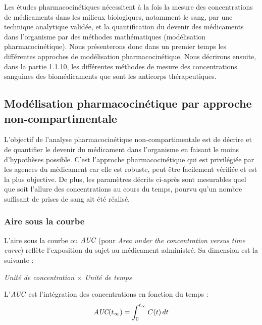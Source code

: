 Les études pharmacocinétiques nécessitent à la fois la mesure des concentrations de médicaments dans les milieux biologiques, notamment le sang, par une technique analytique validée, et la quantification du devenir des médicaments dans l'organisme par des méthodes mathématiques (modélisation pharmacocinétique). Nous présenterons donc dans un premier temps les différentes approches de modélisation pharmacocinétique. Nous décrirons ensuite, dans la partie 1.1.10, les différentes méthodes de mesure des concentrations sanguines des biomédicaments que sont les anticorps thérapeutiques.

\subsection{Modélisation pharmacocinétique par approche non-compartimentale}
L'objectif de l'analyse pharmacocinétique non-compartimentale est de décrire et de quantifier le devenir du médicament dans l'organisme en faisant le moins d'hypothèses possible. C'est l'approche pharmacocinétique qui est privilégiée par les agences du médicament car elle est robuste, peut être facilement vérifiée et est la plus objective. De plus, les paramètres décrits ci-après sont mesurables quel que soit l'allure des concentrations au cours du temps, pourvu qu'un nombre suffisant de prises de sang ait été réalisé.

\subsubsection{Aire sous la courbe}
L'aire sous la courbe ou $\operatorname{\textit{AUC}}$ (pour \textit{Area under the concentration versus time curve}) reflète l'exposition du sujet au médicament administré. Sa dimension est la suivante :

\begin{center}
\textit{Unité de concentration $\times$ Unité de temps}
\end{center}

L'$\operatorname{\textit{AUC}}$ est l'intégration des concentrations en fonction du temps :
\begin{equation}
\operatorname{\textit{AUC}}(t_\infty)=\int_{0}^{t_\infty}C(t) \, dt
\label{eq:1}
\end{equation}

